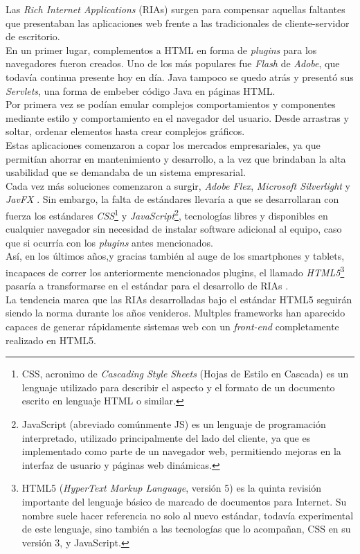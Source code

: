 Las \emph{Rich Internet Applications} (RIAs) surgen para compensar aquellas faltantes que
presentaban las aplicaciones web frente a las tradicionales de cliente-servidor de
escritorio.\\
En un primer lugar, complementos a HTML en forma de \emph{plugins} para los navegadores
fueron creados. Uno de los más populares fue \emph{Flash} de \emph{Adobe}, que todavía
continua presente hoy en día. Java tampoco se quedo atrás y presentó sus \emph{Servlets},
una forma de embeber código Java en páginas HTML.\\
Por primera vez se podían emular complejos comportamientos y componentes mediante estilo
y comportamiento en el navegador del usuario. Desde arrastras y soltar, ordenar elementos
hasta crear complejos gráficos.\\
Estas aplicaciones comenzaron a copar los mercados empresariales, ya que permitían ahorrar
en mantenimiento y desarrollo, a la vez que brindaban la alta usabilidad que se demandaba
de un sistema empresarial.\\
Cada vez más soluciones comenzaron a surgir, \emph{Adobe Flex}, \emph{Microsoft Silverlight}
y \emph{JavFX} . Sin embargo, la falta de estándares llevaría a que
se desarrollaran con fuerza los estándares \emph{CSS}\footnote{
	CSS, acronimo de \emph{\textsc{C}ascading \textsc{S}tyle \textsc{S}heets} (Hojas de
	Estilo en Cascada) es un lenguaje utilizado para describir el aspecto y el formato de un
	documento escrito en lenguaje HTML o similar.
} y \emph{JavaScript}\footnote{
	JavaScript (abreviado comúnmente JS) es un lenguaje de programación interpretado,
	utilizado principalmente del lado del cliente, ya que es implementado como parte de un
	navegador web, permitiendo mejoras en la interfaz de usuario y páginas web dinámicas.
}, tecnologías libres y disponibles en cualquier navegador sin necesidad de instalar
software adicional al equipo, caso que si ocurría con los \emph{plugins} antes mencionados.\\
Así, en los últimos años,y gracias también al auge de los smartphones y tablets, incapaces
de correr los anteriormente mencionados plugins, el llamado \emph{HTML5}\footnote{
	HTML5 (\emph{\textsc{H}yperText \textsc{M}arkup \textsc{L}anguage}, versión 5) es la
	quinta revisión importante del lenguaje básico de marcado de documentos para Internet.
	Su nombre suele hacer referencia no solo al nuevo estándar, todavía experimental de este
	lenguaje, sino también a las tecnologías que lo acompañan, CSS en su versión 3, y
	JavaScript.
} pasaría a transformarse en el estándar para el desarrollo de RIAs .\\
La tendencia marca que las RIAs desarrolladas bajo el estándar HTML5 seguirán siendo la
norma durante los años venideros. Multples frameworks han aparecido capaces de generar
rápidamente sistemas web con un \emph{front-end} completamente realizado en HTML5.\\

